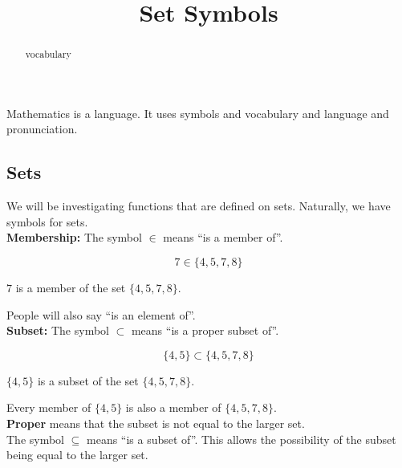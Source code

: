 \documentclass{ximera}
\title{Set Symbols}
\begin{document}
\begin{abstract}
vocabulary
\end{abstract}
\maketitle




Mathematics is a language.  It uses symbols and vocabulary and language and pronunciation. \\




\subsection{Sets}



We will be investigating functions that are defined on sets. Naturally, we have symbols for sets. \\



\textbf{\textcolor{blue!55!black}{Membership:}}  The symbol $\in$ means ``is a member of''.


\[
7 \in \{ 4, 5, 7, 8 \}
\]

\begin{center}

$7$ is a member of the set $\{ 4, 5, 7, 8 \}$.

\end{center}

People will also say ``is an element of''. \\





\textbf{\textcolor{blue!55!black}{Subset:}}  The symbol $\subset$ means ``is a proper subset of''.


\[
\{ 4, 5 \} \subset \{ 4, 5, 7, 8 \}
\]

\begin{center}

$\{ 4, 5 \}$ is a subset of the set $\{ 4, 5, 7, 8 \}$.

\end{center}


Every member of $\{ 4, 5 \}$ is also a member of $\{ 4, 5, 7, 8 \}$. \\


\textbf{Proper} means that the subset is not equal to the larger set. \\


The symbol $\subseteq$ means ``is a subset of''.  This allows the possibility of the subset being equal to the larger set.
\end{document}
